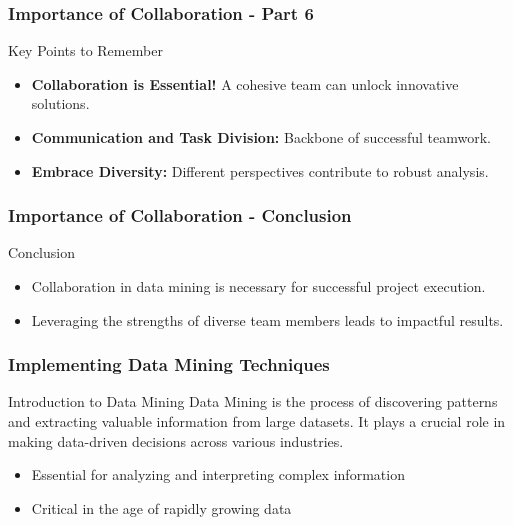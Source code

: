 \documentclass[aspectratio=169]{beamer}
\begin{document}
\begin{frame}[fragile]
    \frametitle{Importance of Collaboration - Part 6}
    \begin{block}{Key Points to Remember}
        \begin{itemize}
            \item \textbf{Collaboration is Essential!} A cohesive team can unlock innovative solutions.
            \item \textbf{Communication and Task Division:} Backbone of successful teamwork.
            \item \textbf{Embrace Diversity:} Different perspectives contribute to robust analysis.
        \end{itemize}
    \end{block}
\end{frame}

\begin{frame}[fragile]
    \frametitle{Importance of Collaboration - Conclusion}
    \begin{block}{Conclusion}
        \begin{itemize}
            \item Collaboration in data mining is necessary for successful project execution.
            \item Leveraging the strengths of diverse team members leads to impactful results.
        \end{itemize}
    \end{block}
\end{frame}

\begin{frame}[fragile]
    \frametitle{Implementing Data Mining Techniques}
    
    \begin{block}{Introduction to Data Mining}
        Data Mining is the process of discovering patterns and extracting valuable information from large datasets. It plays a crucial role in making data-driven decisions across various industries.
    \end{block}
    
    \begin{itemize}
        \item Essential for analyzing and interpreting complex information
        \item Critical in the age of rapidly growing data
    \end{itemize}
    
\end{frame}
\end{document}
